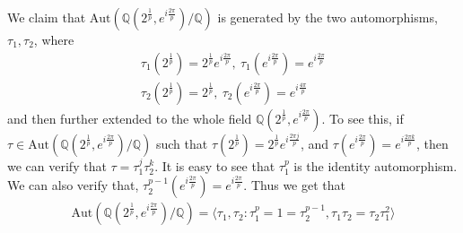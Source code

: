 \documentclass[12pt]{exam}
\theoremstyle{plain} %
\theoremstyle{definition} %
\theoremstyle{remark} %
\begin{document}
\begin{questions}
\begin{solution}
      We claim that $\textrm{Aut}(\mathbb{Q}(2^{\frac{1}{p}},
      e^{i \frac{2 \pi}{ p}})/ \mathbb{Q})$ is generated by the two
      automorphisms, $\tau_1, \tau_2$, where
      \begin{align*}
        \tau_1(2^{\frac{1}{p}}) = 2^{\frac{1}{p}}e^{ i
        \frac{2\pi}{p}}, \ \tau_1(e^{ i \frac{2\pi}{p}}) = e^{ i
        \frac{2\pi}{p}} \\
        \tau_2(2^{\frac{1}{p}}) = 2^{\frac{1}{p}}, \ \tau_2(e^{ i
        \frac{2\pi}{p}}) = e^{ i \frac{4\pi}{p}}
      \end{align*}
      and then further extended to the whole field $\mathbb{Q}(2^{\frac{1}{p}},
      e^{i \frac{2 \pi}{ p}})$. To see this, if $\tau \in
      \textrm{Aut}(\mathbb{Q}(2^{\frac{1}{p}},
      e^{i \frac{2 \pi}{ p}})/ \mathbb{Q})$ such that
      $\tau(2^{\frac{1}{p}}) = 2^{\frac{1}{p}} e^{i \frac{2\pi
      j}{p}}$, and $\tau(e^{i \frac{2\pi}{p}}) = e^{i \frac{2\pi
      k}{p}}$, then we can verify that $\tau = \tau_1^j \tau_2^k$. It
      is easy to see that $\tau_1^p$ is the identity automorphism.
      We can also verify that, $\tau_2^{p-1}( e^{i \frac{2\pi}{p}}) =
      e^{i \frac{2\pi}{p}}$.
      Thus we get that
      \begin{align*}
        \textrm{Aut}(\mathbb{Q}(2^{\frac{1}{p}}, e^{i \frac{2 \pi}{
        p}})/ \mathbb{Q}) = \langle \tau_1, \tau_2 : \tau_1^p = 1 =
        \tau_2^{p-1} , \tau_1 \tau_2 = \tau_2 \tau_1^2 \rangle
      \end{align*}


\end{solution}
\end{questions}
\end{document}

